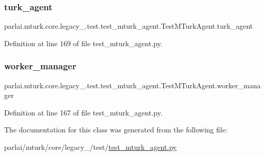 \subsubsection{\texorpdfstring{turk\+\_\+agent}{turk\_agent}}
{\footnotesize\ttfamily parlai.\+mturk.\+core.\+legacy\+\_.\+test.\+test\+\_\+mturk\+\_\+agent.\+Test\+M\+Turk\+Agent.\+turk\+\_\+agent}



Definition at line 169 of file test\+\_\+mturk\+\_\+agent.\+py.

\mbox{\label{classparlai_1_1mturk_1_1core_1_1legacy__2018_1_1test_1_1test__mturk__agent_1_1TestMTurkAgent_aabae177920d5fcae1ba0b7291792be06}} 
\subsubsection{\texorpdfstring{worker\+\_\+manager}{worker\_manager}}
{\footnotesize\ttfamily parlai.\+mturk.\+core.\+legacy\+\_.\+test.\+test\+\_\+mturk\+\_\+agent.\+Test\+M\+Turk\+Agent.\+worker\+\_\+manager}



Definition at line 167 of file test\+\_\+mturk\+\_\+agent.\+py.



The documentation for this class was generated from the following file\+:\begin{DoxyCompactItemize}
\item 
parlai/mturk/core/legacy\+\_/test/\hyperlink{legacy__2018_2test_2test__mturk__agent_8py}{test\+\_\+mturk\+\_\+agent.\+py}\end{DoxyCompactItemize}
